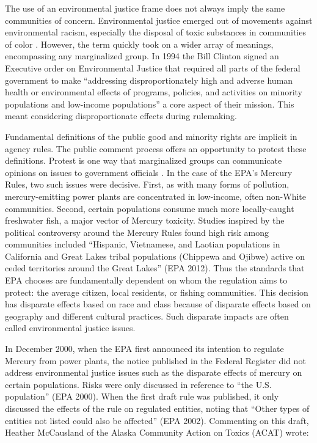 \documentclass[
      12pt,
        ]{article}
\begin{document}
The use of an environmental justice frame does not always imply the same
communities of concern. Environmental justice emerged out of movements
against environmental racism, especially the disposal of toxic
substances in communities of color \citep{Bullard1993}. However, the term
quickly took on a wider array of meanings, encompassing any marginalized
group. In 1994 the Bill Clinton signed an Executive order on
Environmental Justice that required all parts of the federal government
to make ``addressing disproportionately high and adverse human health or
environmental effects of programs, policies, and activities on minority
populations and low-income populations'' a core aspect of their mission.
This meant considering disproportionate effects during rulemaking.

Fundamental definitions of the public good and minority rights are
implicit in agency rules. The public comment process offers an
opportunity to protest these definitions. Protest is one way that
marginalized groups can communicate opinions on issues to government
officials \citep{Gillion2013}. In the case of the EPA's Mercury Rules, two
such issues were decisive. First, as with many forms of pollution,
mercury-emitting power plants are concentrated in low-income, often
non-White communities. Second, certain populations consume much more
locally-caught freshwater fish, a major vector of Mercury toxicity.
Studies inspired by the political controversy around the Mercury Rules
found high risk among communities included ``Hispanic, Vietnamese, and
Laotian populations in California and Great Lakes tribal populations
(Chippewa and Ojibwe) active on ceded territories around the Great
Lakes'' (EPA 2012). Thus the standards that EPA chooses are fundamentally
dependent on whom the regulation aims to protect: the average citizen,
local residents, or fishing communities. This decision has disparate
effects based on race and class because of disparate effects based on
geography and different cultural practices. Such disparate impacts are
often called environmental justice issues.

In December 2000, when the EPA first announced its intention to regulate
Mercury from power plants, the notice published in the Federal Register
did not address environmental justice issues such as the disparate
effects of mercury on certain populations. Risks were only discussed in
reference to ``the U.S. population'' (EPA 2000). When the first draft rule
was published, it only discussed the effects of the rule on regulated
entities, noting that ``Other types of entities not listed could also be
affected'' (EPA 2002). Commenting on this draft, Heather McCausland of
the Alaska Community Action on Toxics (ACAT) wrote:
\end{document}
